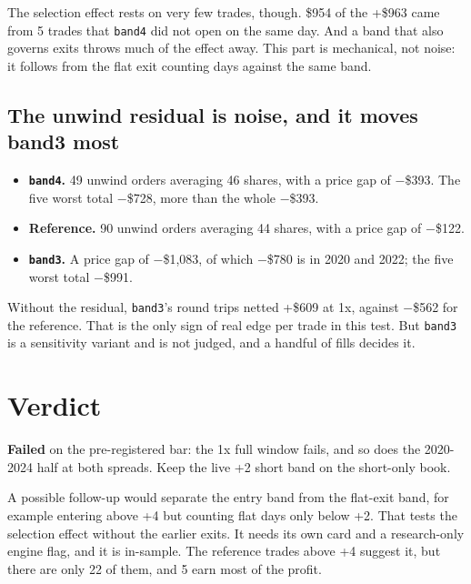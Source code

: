 \documentclass{article}
\begin{document}
The selection effect rests on very few trades, though. \$954 of the +\$963 came from 5 trades that \texttt{band4} did not open on the same day. And a band that also governs exits throws much of the effect away. This part is mechanical, not noise: it follows from the flat exit counting days against the same band.

\subsection{The unwind residual is noise, and it moves band3 most}

\begin{itemize}

\item \textbf{\texttt{band4}.} 49 unwind orders averaging 46 shares, with a price gap of \ensuremath{-}\$393. The five worst total \ensuremath{-}\$728, more than the whole \ensuremath{-}\$393.

\item \textbf{Reference.} 90 unwind orders averaging 44 shares, with a price gap of \ensuremath{-}\$122.

\item \textbf{\texttt{band3}.} A price gap of \ensuremath{-}\$1,083, of which \ensuremath{-}\$780 is in 2020 and 2022; the five worst total \ensuremath{-}\$991.

\end{itemize}

Without the residual, \texttt{band3}'s round trips netted +\$609 at 1x, against \ensuremath{-}\$562 for the reference. That is the only sign of real edge per trade in this test. But \texttt{band3} is a sensitivity variant and is not judged, and a handful of fills decides it.

\section{Verdict}

\textbf{Failed} on the pre-registered bar: the 1x full window fails, and so does the 2020-2024 half at both spreads. Keep the live +2 short band on the short-only book.

A possible follow-up would separate the entry band from the flat-exit band, for example entering above +4 but counting flat days only below +2. That tests the selection effect without the earlier exits. It needs its own card and a research-only engine flag, and it is in-sample. The reference trades above +4 suggest it, but there are only 22 of them, and 5 earn most of the profit.
\end{document}
